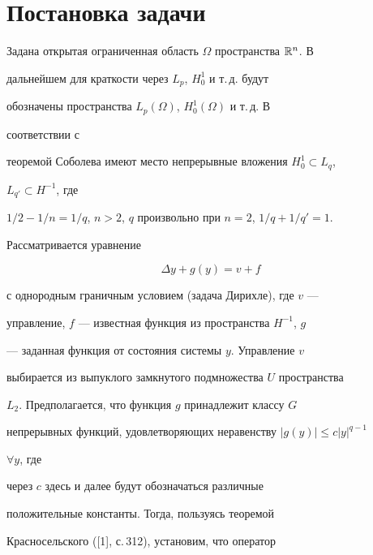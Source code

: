 \label{begin} 


 


 


 


 


\section{Постановка задачи} 


 


Задана открытая ограниченная область $\Omega$ пространства $\Bbb R^n$. В 


дальнейшем для краткости через $L_p$, $H^1_0$ и т.\,д. будут 


обозначены пространства $L_p(\Omega)$, $H^1_0(\Omega)$ и т.\,д. В 


соответствии с 


теоремой Соболева имеют место непрерывные вложения $H^1_0\subset L_q$, 


$L_{q'}\subset H^{-1}$, где 


$1/2-1/n=1/q$, $n>2$, $q$ произвольно при $n=2$, $1/q+1/q'=1$. 


Рассматривается уравнение 


\begin{equation} 


\Delta y+g(y)=v+f 


\end{equation} 


с однородным граничным условием (задача Дирихле), где $v$ --- 


управление, $f$ --- известная функция из пространства $H^{-1}$, $g$


--- заданная функция от состояния системы $y$. Управление $v$ 


выбирается из выпуклого замкнутого подмножества $U$ пространства 


$L_2$. Предполагается, что функция $g$ принадлежит классу $G$ 


непрерывных функций, удовлетворяющих неравенству $|g(y)|\le c|y|^{q-1}$ 


$\forall y$, где 


через $c$ здесь и далее будут обозначаться различные 


положительные константы. Тогда, пользуясь теоремой 


Красносельского ([1], с.\,312), установим, что оператор 



